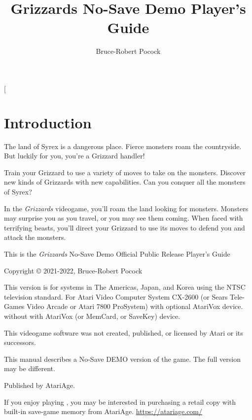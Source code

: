 \documentclass[10pt,twocolumn,openany,article]{memoir}
\title{Grizzards \ifdefined\NOSAVE No-Save \fi\ifdefined\DEMO Demo \fi Player's Guide}
\author{Bruce-Robert Pocock}
\newcommand\TV{NTSC}
\newcommand\REGION{The Americas, Japan, and Korea}
\newcommand\TV{PAL}
\newcommand\REGION{UK and Western Europe (except France)}
\newcommand\TV{SECAM}
\newcommand\REGION{France, Eastern Europe, and Africa}
\begin{document}
\frontmatter


\thispagestyle{empty}


\twocolumn[

\chapter*{Introduction}\label{Introduction}

The  land of  Syrex  is  a dangerous  place.  Fierce  monsters roam  the
countryside. But luckily for you, you're a Grizzard handler!

Train your Grizzard to  use a variety of moves to  take on the monsters.
Discover new kinds  of Grizzards with new capabilities.  Can you conquer
all the monsters of Syrex?

\bigskip

In the  \textit{Grizzards} videogame, you'll  roam the land  looking for
monsters. Monsters may  surprise you as you travel, or  you may see them
coming. When faced  with terrifying beasts, you'll  direct your Grizzard
to use its moves to defend you and attack the monsters.

\vspace{1in}\vfill

This    is    the     \textit{Grizzards}    \ifdefined\NOSAVE    No-Save
\fi\ifdefined\DEMO Demo \fi\ifdefined\ATARIAGESAVE Official \else Public
Release \fi Player's Guide

Copyright \copyright{} 2021-2022, Bruce-Robert Pocock

\bigskip

This  version is  for systems  in \REGION{}  using the  \TV{} television
standard. For Atari  Video Computer System CX-2600  (or Sears Tele-Games
Video  Arcade  or  Atari 7800  ProSystem)  \ifdefined\ATARIAGESAVE  with
optional AtariVox device. \else \ifdefined\NOSAVE without \else with \fi
AtariVox (or MemCard, or SaveKey) device. \fi

\bigskip

This videogame software was not created, published, or licensed by Atari
or its successors.

\ifdefined\DEMO
\bigskip

This manual  describes a \ifdefined\NOSAVE  No-Save \fi DEMO  version of
the game. The full version may be different.

\fi

Published by AtariAge.

\ifdefined\ATARIAGESAVE\else  If you  enjoy playing  ,
you  may  be  interested  in  purchasing a  retail  copy  with  built-in
save-game          memory           from          AtariAge.          \fi
\href{https://atariage.com/}{https://atariage.com/}
\end{document}
